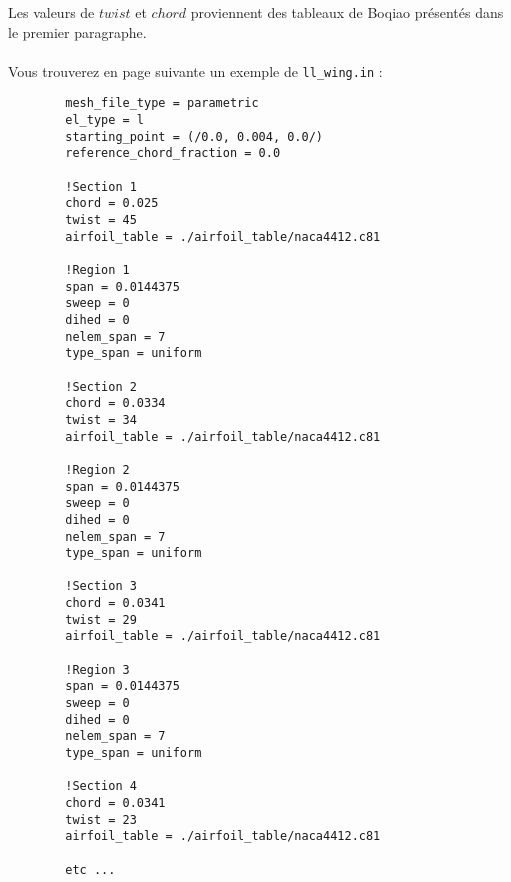 \documentclass{article}
\begin{document}
	Les valeurs de $twist$ et $chord$ proviennent des tableaux de Boqiao présentés dans le premier paragraphe. \\ \\
	Vous trouverez en page suivante un exemple de \verb!ll_wing.in! :  \clearpage
	\begin{lstlisting}
		mesh_file_type = parametric
		el_type = l
		starting_point = (/0.0, 0.004, 0.0/)
		reference_chord_fraction = 0.0
		
		!Section 1
		chord = 0.025
		twist = 45
		airfoil_table = ./airfoil_table/naca4412.c81
		
		!Region 1
		span = 0.0144375
		sweep = 0
		dihed = 0
		nelem_span = 7
		type_span = uniform
		
		!Section 2
		chord = 0.0334
		twist = 34
		airfoil_table = ./airfoil_table/naca4412.c81
		
		!Region 2
		span = 0.0144375
		sweep = 0
		dihed = 0
		nelem_span = 7
		type_span = uniform
		
		!Section 3
		chord = 0.0341
		twist = 29
		airfoil_table = ./airfoil_table/naca4412.c81
		
		!Region 3
		span = 0.0144375
		sweep = 0
		dihed = 0
		nelem_span = 7
		type_span = uniform
		
		!Section 4
		chord = 0.0341
		twist = 23
		airfoil_table = ./airfoil_table/naca4412.c81
		
		etc ...
	\end{lstlisting}
\end{document}
